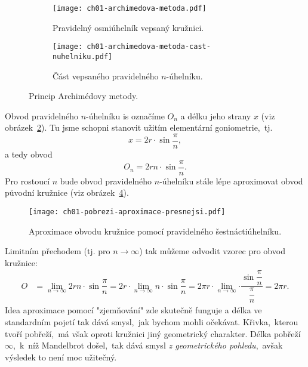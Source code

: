 \begin{figure}[h]
    \centering
    \begin{subfigure}{\subfigwidth}
        \centering
        \texttt{[image: ch01-archimedova-metoda.pdf]}
        \caption{Pravidelný osmiúhelník vepsaný kružnici.}
        \label{subfig:archimedova_metoda}
    \end{subfigure}
    \quad
    \begin{subfigure}{\subfigwidth}
        \centering
        \texttt{[image: ch01-archimedova-metoda-cast-nuhelniku.pdf]}
        \caption{Část vepsaného pravidelného $n$-úhelníku.}
        \label{subfig:archimedova_metoda_cast_nuhelniku}
    \end{subfigure}
    \caption{Princip Archimédovy metody.}
    \label{fig:princip_archimedovy_metody}
\end{figure}
Obvod pravidelného $n$-úhelníku is označíme $O_n$ a délku jeho strany $x$ (viz obrázek~\ref{subfig:archimedova_metoda_cast_nuhelniku}). Tu jsme schopni stanovit užitím elementární goniometrie,~tj.
\begin{equation*}
    x=2r\cdot\sin{\dfrac{\pi}{n}},
\end{equation*}
a tedy obvod
\begin{equation*}
    O_n=2rn\cdot\sin{\dfrac{\pi}{n}}.
\end{equation*}
Pro rostoucí $n$ bude obvod pravidelného $n$-úhelníku stále lépe aproximovat obvod původní kružnice (viz obrázek~\ref{fig:archimedova_metoda_presnejsi}).
\begin{figure}[h]
    \centering
    \texttt{[image: ch01-pobrezi-aproximace-presnejsi.pdf]}
    \caption{Aproximace obvodu kružnice pomocí pravidelného šestnáctiúhelníku.}
    \label{fig:archimedova_metoda_presnejsi}
\end{figure}
Limitním přechodem (tj. pro $n\to\infty$) tak můžeme odvodit vzorec pro obvod kružnice:
\begin{align*}
    O&=\lim_{n\to\infty}{2rn\cdot\sin{\dfrac{\pi}{n}}}=2r\cdot\lim_{n\to\infty}{n\cdot\sin{\dfrac{\pi}{n}}}=2\pi r\cdot\lim_{n\to\infty}{\cdot\dfrac{\sin{\dfrac{\pi}{n}}}{\dfrac{\pi}{n}}}=2\pi r.
\end{align*}
Idea aproximace pomocí "zjemňování" zde skutečně funguje a délka ve standardním pojetí tak dává smysl,~jak bychom mohli očekávat. Křivka,~kterou tvoří pobřeží,~má však oproti kružnici jiný geometrický charakter. Délka pobřeží $\infty$,~k~níž Mandelbrot došel,~tak dává smysl \emph{z geometrického pohledu},~avšak výsledek to není moc užitečný.